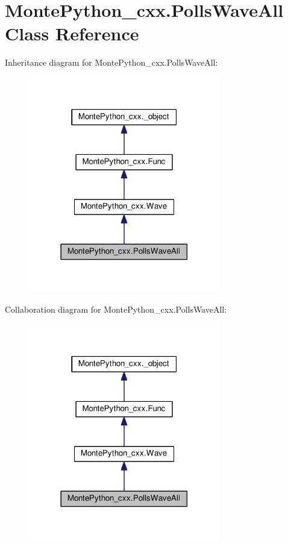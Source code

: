 \hypertarget{classMontePython__cxx_1_1PollsWaveAll}{}\section{Monte\+Python\+\_\+cxx.\+Polls\+Wave\+All Class Reference}
\label{classMontePython__cxx_1_1PollsWaveAll}


Inheritance diagram for Monte\+Python\+\_\+cxx.\+Polls\+Wave\+All\+:
\nopagebreak
\begin{figure}[H]
\begin{center}
\leavevmode
\includegraphics[width=237pt]{classMontePython__cxx_1_1PollsWaveAll__inherit__graph}
\end{center}
\end{figure}


Collaboration diagram for Monte\+Python\+\_\+cxx.\+Polls\+Wave\+All\+:
\nopagebreak
\begin{figure}[H]
\begin{center}
\leavevmode
\includegraphics[width=237pt]{classMontePython__cxx_1_1PollsWaveAll__coll__graph}
\end{center}
\end{figure}

